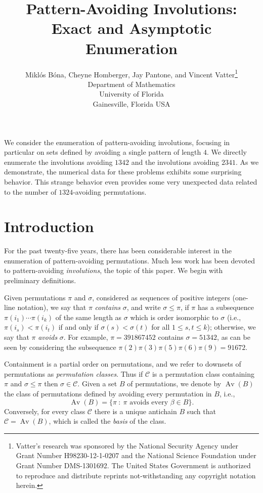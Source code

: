 \documentclass[10pt]{article}
\title{\sc Pattern-Avoiding Involutions: Exact and Asymptotic Enumeration}
\author{%
Mikl\'os B\'ona, Cheyne Homberger, Jay Pantone, and Vincent Vatter\footnotemark[\value{footnote}]\footnote{Vatter's research was sponsored by the National Security Agency under Grant Number H98230-12-1-0207 and the National Science Foundation under Grant Number DMS-1301692.  The United States Government is authorized to reproduce and distribute reprints not-withstanding any copyright notation herein.}\\[-0.25ex]
\small Department of Mathematics\\[-0.5ex]
\small University of Florida\\[-0.5ex]
\small Gainesville, Florida USA\\[-1.5ex]
}
\date{}
\theoremstyle{plain}
\renewenvironment{abstract}%
                {
                  \begin{list}{}%
                     {\setlength{\rightmargin}{1in}%
                      \setlength{\leftmargin}{1in}}%
                   \item[]\ignorespaces\begin{small}}%
                 {\end{small}\unskip\end{list}}
\newcommand{\Av}{\operatorname{Av}}
\newcommand{\C}{\mathcal{C}}
\newcommand{\st}{\::\:}
\begin{document}
\maketitle

\pagestyle{main}

\begin{abstract}
We consider the enumeration of pattern-avoiding involutions, focusing in particular on sets defined by avoiding a single pattern of length $4$. We directly enumerate the involutions avoiding $1342$ and the involutions avoiding $2341$. As we demonstrate, the numerical data for these problems exhibits some surprising behavior. This strange behavior even provides some very unexpected data related to the number of $1324$-avoiding permutations.
\end{abstract}

\section{Introduction}

For the past twenty-five years, there has been considerable interest in the enumeration of pattern-avoiding permutations. Much less work has been devoted to pattern-avoiding \emph{involutions}, the topic of this paper. We begin with preliminary definitions.

%
%
%
%
%
%
%
%
%
%
%
%

Given permutations $\pi$ and $\sigma$, considered as sequences of positive integers (one-line notation), we say that $\pi$ \emph{contains} $\sigma$, and write $\sigma\le\pi$, if $\pi$ has a subsequence $\pi(i_1)\cdots\pi(i_k)$ of the same length as $\sigma$ which is order isomorphic to $\sigma$ (i.e.,~$\pi(i_s) < \pi(i_t)$ if and only if $\sigma(s) < \sigma(t)$ for all $1\le s,t\le k$); otherwise, we say that $\pi$ \emph{avoids} $\sigma$. For example, $\pi=391867452$ contains $\sigma=51342$, as can be seen by considering the subsequence $\pi(2)\pi(3)\pi(5)\pi(6)\pi(9)=91672$.

Containment is a partial order on permutations, and we refer to downsets of permutations as \emph{permutation classes}. Thus if $\C$ is a permutation class containing $\pi$ and $\sigma\le\pi$ then $\sigma\in\C$. Given a set $B$ of permutations, we denote by $\Av(B)$ the class of permutations defined by avoiding every permutation in $B$, i.e.,
\[
\Av(B)=\{\pi\st\text{$\pi$ avoids every $\beta\in B$}\}.
\]
Conversely, for every class $\C$ there is a unique antichain $B$ such that $\C=\Av(B)$, which is called the \emph{basis} of the class.
\end{document}
